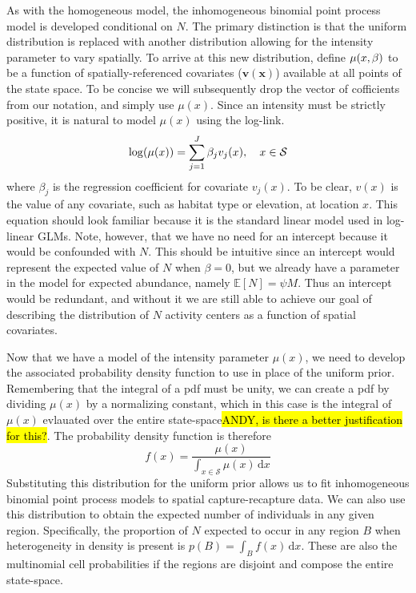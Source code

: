 As with the homogeneous model, the inhomogeneous binomial point process
model is developed conditional on $N$. The primary distinction is that
the uniform distribution is replaced with another distribution
allowing for the intensity parameter to vary spatially. To arrive at
this new distribution, define $\mu(x, {\bf \beta})$ to be a function of
spatially-referenced covariates ($\mathbf{v(x)}$) available at all points of the state
space.  To be concise we will subsequently drop the vector of cofficients from our
notation, and simply use $\mu(x)$. Since an intensity must be strictly
positive, it is natural to model $\mu(x)$ using the log-link.
\[
\log(\mu(x)) = \sum_{j=1}^J \beta_j v_j(x), \quad  x \in \cal{S}
\]
where $\beta_j$ is the regression coefficient for covariate
$v_j(x)$. To be clear, $v(x)$ is the value of any covariate, such as
habitat type or elevation, at location $x$.  This equation should look
familiar because it is the standard linear model used in log-linear
GLMs. Note, however, that we have no need
for an intercept because it would be confounded with
$N$. This should be intuitive since an intercept would
represent the expected value of $N$ when $\beta=0$, but we already
have a parameter in the model for expected abundance, namely $\mathbb{E}[N] =
\psi M$. Thus an intercept would be
redundant, and without it we are still able to achieve our goal of
describing the distribution of $N$ activity centers as a function of
spatial covariates.

Now that we have a model of the intensity parameter $\mu(x)$,
we need to develop the associated probability density function to use
in place of the uniform prior. Remembering that
the integral of a pdf must be unity, we can create a pdf by dividing
$\mu(x)$ by a normalizing constant, which in this case is the integral
of $\mu(x)$ evlauated over the entire
state-space\hl{ANDY, is there a better justification for this?}. The
probability density function is therefore
\begin{equation}
f(x) = \frac{\mu(x)}{\int_{x \in \mathcal{S}} \mu(x)\, \mathrm{d}x}
\label{eq:pdf-ipp}
\end{equation}
Substituting this distribution for the
uniform prior allows us to fit inhomogeneous binomial point process
models to spatial capture-recapture data. We can also use this
distribution to obtain the expected number of individuals in any given
region. Specifically, the proportion of $N$ expected to occur in any
region $B$ when heterogeneity in density is present is $p(B) = \int_B
f(x)\, \mathrm{d}x$. These are
also the multinomial cell probabilities if the regions are
disjoint and compose the entire state-space.

